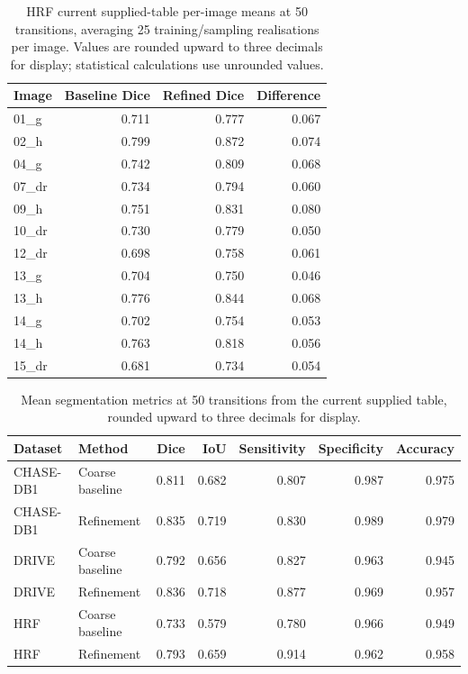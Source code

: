 \documentclass[jimaging,article,submit,pdftex,moreauthors]
  {Definitions/mdpi}
\begin{document}
\begin{table}[htbp]
\centering
\caption{HRF current supplied-table per-image means at 50 transitions, averaging 25 training/sampling realisations per image. Values are rounded upward to three decimals for display; statistical calculations use unrounded values.}
\label{tab:hrf_per_image_supplied}
\scriptsize
\begin{tabular}{lrrr}
\toprule
Image & Baseline Dice & Refined Dice & Difference \\
\midrule
01\_g & 0.711 & 0.777 & 0.067 \\
02\_h & 0.799 & 0.872 & 0.074 \\
04\_g & 0.742 & 0.809 & 0.068 \\
07\_dr & 0.734 & 0.794 & 0.060 \\
09\_h & 0.751 & 0.831 & 0.080 \\
10\_dr & 0.730 & 0.779 & 0.050 \\
12\_dr & 0.698 & 0.758 & 0.061 \\
13\_g & 0.704 & 0.750 & 0.046 \\
13\_h & 0.776 & 0.844 & 0.068 \\
14\_g & 0.702 & 0.754 & 0.053 \\
14\_h & 0.763 & 0.818 & 0.056 \\
15\_dr & 0.681 & 0.734 & 0.054 \\
\bottomrule
\end{tabular}
\end{table}
\begin{table}[htbp]
\centering
\caption{Mean segmentation metrics at 50 transitions from the current supplied table, rounded upward to three decimals for display.}
\label{tab:supplied_paired_metric_means}
\scriptsize
\begin{tabular}{llrrrrr}
\toprule
Dataset & Method & Dice & IoU & Sensitivity & Specificity & Accuracy \\
\midrule
CHASE-DB1 & Coarse baseline & 0.811 & 0.682 & 0.807 & 0.987 & 0.975 \\
CHASE-DB1 & Refinement & 0.835 & 0.719 & 0.830 & 0.989 & 0.979 \\
DRIVE & Coarse baseline & 0.792 & 0.656 & 0.827 & 0.963 & 0.945 \\
DRIVE & Refinement & 0.836 & 0.718 & 0.877 & 0.969 & 0.957 \\
HRF & Coarse baseline & 0.733 & 0.579 & 0.780 & 0.966 & 0.949 \\
HRF & Refinement & 0.793 & 0.659 & 0.914 & 0.962 & 0.958 \\
\bottomrule
\end{tabular}
\end{table}
\end{document}
